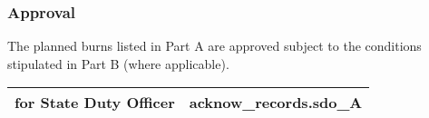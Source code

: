 \subsubsection{Approval}
The planned burns listed in Part A are approved subject to the conditions stipulated in Part B (where applicable).
\begin{tabu} to \linewidth { | X[0.4] | X | }
\hline
\textbf{for State Duty Officer} & \textbf{ {{ acknow_records.sdo_A }} } \\
\hline
\end{tabu}\\%

\clearpage
